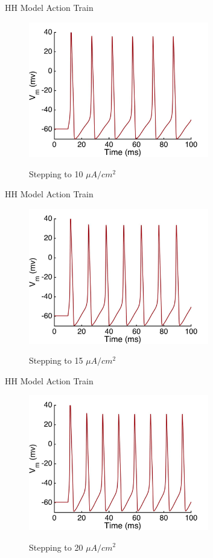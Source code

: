 \documentclass{beamer}
\begin{document}
\begin{frame}{HH Model Action Train}
  \begin{figure}
    \centering
    \includegraphics[width = 0.7\textwidth]{./images/current_0_10.jpg}

    Stepping to 10 $\mu A/cm^2$
  \end{figure}
\end{frame}


\begin{frame}{HH Model Action Train}
  \begin{figure}
    \centering
    \includegraphics[width = 0.7\textwidth]{./images/current_0_15.jpg}

    Stepping to 15 $\mu A/cm^2$
  \end{figure}
\end{frame}


\begin{frame}{HH Model Action Train}
  \begin{figure}
    \centering
    \includegraphics[width = 0.7\textwidth]{./images/current_0_20.jpg}

    Stepping to 20 $\mu A/cm^2$
  \end{figure}
\end{frame}
\end{document}
